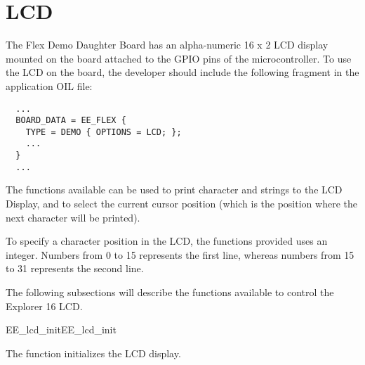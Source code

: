 
\section{LCD}

The Flex Demo Daughter Board has an alpha-numeric 16 x 2 LCD display mounted
on the board attached to the GPIO pins of the microcontroller. To use
the LCD on the board, the developer should
include the following fragment in the application OIL file:

\begin{lstlisting}
  ...
  BOARD_DATA = EE_FLEX {
    TYPE = DEMO { OPTIONS = LCD; };
    ...
  }
  ...
\end{lstlisting}

The functions available can be used to print character and strings to
the LCD Display, and to select the current cursor position (which is
the position where the next character will be printed).

To specify a character position in the LCD, the functions provided
uses an integer. Numbers from 0 to 15 represents the first line,
whereas numbers from 15 to 31 represents the second line.

The following subsections will describe the functions available to
control the Explorer 16 LCD.


\begin{function_nopb2}{EE\_lcd\_init}{EE_lcd_init}
  
  \begin{fundescription}
    The function initializes the LCD display.
  \end{fundescription}
  
  
  
\end{function_nopb2}

